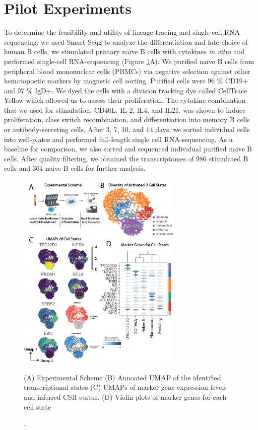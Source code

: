 \section{Pilot Experiments}

To determine the feasibility and utility of lineage tracing and single-cell RNA sequencing, we used Smart-Seq2 to analyze the differentiation and fate choice of human B cells, we stimulated primary naïve B cells with cytokines \textit{in vitro} and performed single-cell RNA-sequencing  (Figure \ref{fig:paper2_prelimfig_1}A). We purified naïve B cells from peripheral blood mononuclear cells (PBMCs) via negative selection against other hematopoetic markers by magnetic cell sorting. Purified cells were 96 \% CD19+ and 97 \% IgD+. We dyed the cells with a division tracking dye called CellTrace Yellow which allowed us to assess their proliferation. The cytokine combination that we used for stimulation, CD40L, IL-2, IL4, and IL21, was shown to induce proliferation, class switch recombination, and differentiation into memory B cells or antibody-secreting cells\cite{konforte_il-21_2009}. After 3, 7, 10, and 14 days, we sorted individual cells into well-plates and performed full-length single cell RNA-sequencing. As a baseline for comparison, we also sorted and sequenced individual purified naive B cells. After quality filtering, we obtained the transcriptomes of 986 stimulated B cells and 364 naive B cells for further analysis.
\begin{figure}[hbt!]
\centering
\includegraphics[width=8cm, keepaspectratio]{figs/prelim_InVitro/BCellLineagePaper_Figure 1.png}
\caption[Experimental overview and transcriptional data for Naive B cell activation].{(A) Experimental Scheme (B) Annoated UMAP of the identified transcriptional states (C) UMAPs of marker gene expression levels and inferred CSR status. (D) Violin plots of marker genes for each cell state}
\label{fig:paper2_prelimfig_1}
\end{figure}
